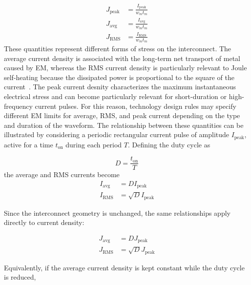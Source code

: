\begin{align}
    J_{\mathrm{peak}} &= \frac{I_{\mathrm{peak}}}{w_m t_m}
    \label{eq:em_jpeak} \\
    J_{\mathrm{avg}} &= \frac{I_{\mathrm{avg}}}{w_m t_m}
    \label{eq:em_javg}
    \\
    J_{\mathrm{RMS}} &= \frac{I_{\mathrm{RMS}}}{w_m t_m}
    \label{eq:em_jrms}
\end{align}
These quantities represent different forms of stress on the interconnect. The average current density is associated with the long-term net transport of metal caused by \ac{EM}, whereas the RMS current density is particularly relevant to Joule self-heating because the dissipated power is proportional to the square of the current~\cite{rzepka_self_heating_1998}. The peak current desnity characterizes the maximum instantaneous electrical stress and can become particularly relevant for short-duration or high-frequency current pulses. For this reason, technology design rules may specify different \ac{EM} limits for average, \ac{RMS}, and peak current depending on the type and duration of the waveform.
The relationship between these quantities can be illustrated by considering a periodic rectangular current pulse of amplitude $I_{\mathrm{peak}}$, active for a time $t_{\mathrm{on}}$ during each period $T$. Defining the duty cycle as

\begin{equation}
    D = \frac{t_{\mathrm{on}}}{T}
    \label{eq:em_duty_cycle}
    \end{equation}
    the average and RMS currents become
    \begin{align}
    I_{\mathrm{avg}} &= D I_{\mathrm{peak}}
    \label{eq:em_pulse_iavg}
    \\
    I_{\mathrm{RMS}} &= \sqrt{D}I_{\mathrm{peak}}
    \label{eq:em_pulse_irms}
\end{align}

Since the interconnect geometry is unchanged, the same relationships apply directly to current density:

\begin{align}
    J_{\mathrm{avg}} &= D J_{\mathrm{peak}}
    \label{eq:em_pulse_javg}
    \\
    J_{\mathrm{RMS}} &= \sqrt{D}J_{\mathrm{peak}}
    \label{eq:em_pulse_jrms}
\end{align}

Equivalently, if the average current density is kept constant while the duty cycle is reduced,

